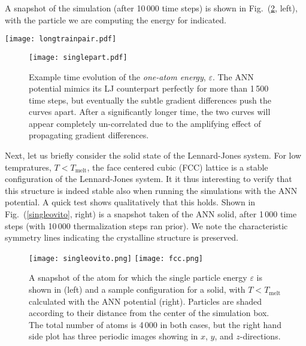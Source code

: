 \documentclass[../../master.tex]{subfiles}
\begin{document}
A snapshot of the simulation (after 10\,000 time steps) is shown in Fig.\ (\ref{fig:singleovito}, left), with the particle we are computing the energy for indicated.   


\begin{SCfigure}
\centering
\texttt{[image: longtrainpair.pdf]}
\caption{The pair correlation function, $g(r)$, calculated during a MD simulation with LAMMPS. A total of 4\,000 atoms are simulated, using a standard shifted Lennard-Jones potential with cutoff at $2.5\sigma$, and an ANN potential trained on the LJ data.\label{fig:ljpair}}
\end{SCfigure}

\begin{figure}[p]
\centering
\texttt{[image: singlepart.pdf]}
\caption{Example time evolution of the \emph{one-atom energy}, $\varepsilon$. The ANN potential mimics its LJ counterpart perfectly for more than 1\,500 time steps, but eventually the subtle gradient differences push the curves apart. After a significantly longer time, the two curves will appear completely un-correlated due to the amplifying effect of propagating gradient differences.  \label{fig:singlepart}}
\end{figure}

Next, let us briefly consider the solid state of the Lennard-Jones system. For low tempratures, $T<T_\text{melt}$, the face centered cubic (FCC) lattice is a stable configuration of the Lennard-Jones system. It it thus interesting to verify that this structure is indeed stable also when running the simulations with the ANN potential. A quick test shows qualitatively that this holds. Shown in Fig.\ (\ref{singleovito}, right) is a snapshot taken of the ANN solid, after 1\,000 time steps (with 10\,000 thermalization steps ran prior). We note the characteristic symmetry lines indicating the crystalline structure is preserved.



\begin{figure}[p]
\centering
\texttt{[image: singleovito.png]}
\texttt{[image: fcc.png]}
\caption{A snapshot of the atom for which the single particle energy $\varepsilon$ is shown in  (left) and a sample configuration for a solid, with $T<T_\text{melt}$ calculated with the ANN potential (right). Particles are shaded according to their distance from the center of the simulation box. The total number of atoms is 4\,000 in both cases, but the right hand side plot has three periodic images showing in $x$, $y$, and $z$-directions. \label{fig:singleovito}}
\end{figure}
\end{document}
